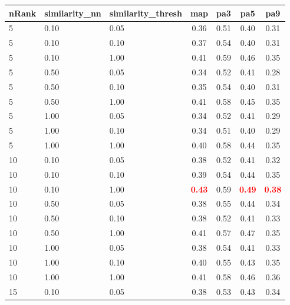 \documentclass[12pt,a4paper,fleqn]{tufte-handout}
\begin{document}
 
\begin{table}                     
\begin{center}                     
\scriptsize                     
\setlength{\tabcolsep}{.16667em}                     
\begin{tabular}{lllcccc}                     
nRank & similarity\_nn & similarity\_thresh & map & pa3 & pa5 & pa9 \\                     
\hline                     
5 & 0.10 & 0.05 & 0.36 & 0.51 & 0.40 & 0.31 \\                     
5 & 0.10 & 0.10 & 0.37 & 0.54 & 0.40 & 0.31 \\                     
5 & 0.10 & 1.00 & 0.41 & 0.59 & 0.46 & 0.35 \\                     
5 & 0.50 & 0.05 & 0.34 & 0.52 & 0.41 & 0.28 \\                     
5 & 0.50 & 0.10 & 0.35 & 0.54 & 0.40 & 0.31 \\                     
5 & 0.50 & 1.00 & 0.41 & 0.58 & 0.45 & 0.35 \\                     
5 & 1.00 & 0.05 & 0.34 & 0.52 & 0.41 & 0.29 \\                     
5 & 1.00 & 0.10 & 0.34 & 0.51 & 0.40 & 0.29 \\                     
5 & 1.00 & 1.00 & 0.40 & 0.58 & 0.44 & 0.35 \\                     
10 & 0.10 & 0.05 & 0.38 & 0.52 & 0.41 & 0.32 \\                     
10 & 0.10 & 0.10 & 0.39 & 0.54 & 0.44 & 0.35 \\                     
10 & 0.10 & 1.00 & \textbf{\textcolor{red}{0.43}} & 0.59 & \textbf{\textcolor{red}{0.49}} & \textbf{\textcolor{red}{0.38}} \\                     
10 & 0.50 & 0.05 & 0.38 & 0.55 & 0.44 & 0.34 \\                     
10 & 0.50 & 0.10 & 0.38 & 0.52 & 0.41 & 0.33 \\                     
10 & 0.50 & 1.00 & 0.41 & 0.57 & 0.47 & 0.35 \\                     
10 & 1.00 & 0.05 & 0.38 & 0.54 & 0.41 & 0.33 \\                     
10 & 1.00 & 0.10 & 0.40 & 0.55 & 0.43 & 0.35 \\                     
10 & 1.00 & 1.00 & 0.41 & 0.58 & 0.46 & 0.36 \\                     
15 & 0.10 & 0.05 & 0.38 & 0.53 & 0.43 & 0.34 \\                     

\end{tabular}
\end{center}
\end{table}
\end{document}
